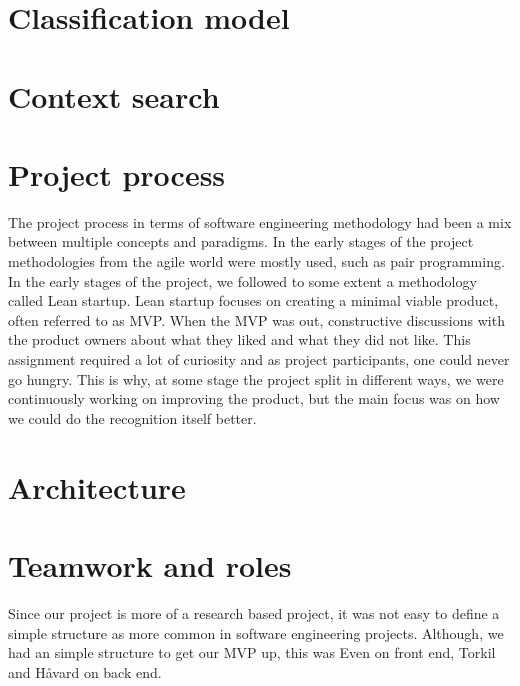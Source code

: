 \section{Classification model}


\section{Context search}

\section{Project process}
The project process in terms of software engineering methodology had been a mix between multiple concepts and paradigms. In the early stages of the project methodologies from the agile world were mostly used, such as pair programming. In the early stages of the project, we followed to some extent a methodology called Lean startup. Lean startup focuses on creating a minimal viable product, often referred to as \gls{MVP}. When the MVP was out, constructive discussions with the product owners about what they liked and what they did not like. This assignment required a lot of curiosity and as project participants, one could never go hungry. This is why, at some stage the project split in different ways, we were continuously working on improving the product, but the main focus was on how we could do the recognition itself better.

\section{Architecture}

\section{Teamwork and roles}
Since our project is more of a research based project, it was not easy to define a simple structure as more common in software engineering projects. Although, we had an simple structure to get our MVP up, this was Even on front end, Torkil and Håvard on back end. %